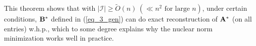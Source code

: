 \documentclass[../main.tex]{subfiles}
\begin{document}
This theorem shows that with $|\mathcal{I}|\geq \tilde{{O}}(n)\ (\ll n^2 \text{ for large } n)$, under certain conditions, ${\bf B}^*$ defined in (\ref{eq_3_gen}) can do exact reconstruction of ${\bf A}^*$ (on all entries) w.h.p., which to some degree explains why the nuclear norm minimization works well in practice.  
\end{document}
